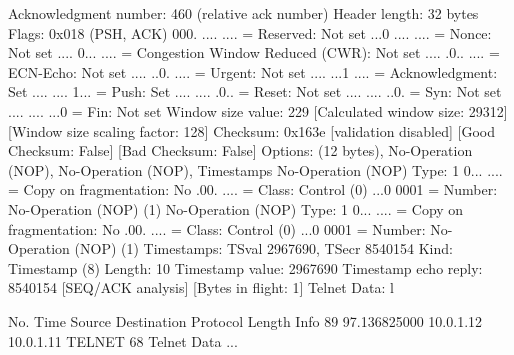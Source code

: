     Acknowledgment number: 460    (relative ack number)
    Header length: 32 bytes
    Flags: 0x018 (PSH, ACK)
        000. .... .... = Reserved: Not set
        ...0 .... .... = Nonce: Not set
        .... 0... .... = Congestion Window Reduced (CWR): Not set
        .... .0.. .... = ECN-Echo: Not set
        .... ..0. .... = Urgent: Not set
        .... ...1 .... = Acknowledgment: Set
        .... .... 1... = Push: Set
        .... .... .0.. = Reset: Not set
        .... .... ..0. = Syn: Not set
        .... .... ...0 = Fin: Not set
    Window size value: 229
    [Calculated window size: 29312]
    [Window size scaling factor: 128]
    Checksum: 0x163e [validation disabled]
        [Good Checksum: False]
        [Bad Checksum: False]
    Options: (12 bytes), No-Operation (NOP), No-Operation (NOP), Timestamps
        No-Operation (NOP)
            Type: 1
                0... .... = Copy on fragmentation: No
                .00. .... = Class: Control (0)
                ...0 0001 = Number: No-Operation (NOP) (1)
        No-Operation (NOP)
            Type: 1
                0... .... = Copy on fragmentation: No
                .00. .... = Class: Control (0)
                ...0 0001 = Number: No-Operation (NOP) (1)
        Timestamps: TSval 2967690, TSecr 8540154
            Kind: Timestamp (8)
            Length: 10
            Timestamp value: 2967690
            Timestamp echo reply: 8540154
    [SEQ/ACK analysis]
        [Bytes in flight: 1]
Telnet
    Data: l

No.     Time           Source                Destination           Protocol Length Info
     89 97.136825000   10.0.1.12             10.0.1.11             TELNET   68     Telnet Data ...

